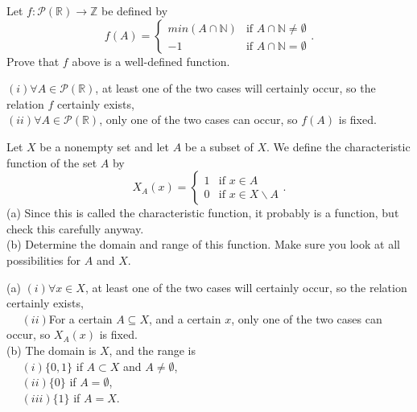 \documentclass[11pt, a4paper, UTF8]{ctexart}
\begin{document}
\begin{problem}[UD: 13.4]
  Let $f:\mathcal{P}(\mathbb{R}) \rightarrow \mathbb{Z}$ be defined by\\
  $$f(A) = 
    \begin{cases}
      min(A \cap \mathbb{N})& \text{if $A \cap \mathbb{N} \neq \emptyset$}\\
      -1& \text{if $A \cap \mathbb{N} = \emptyset$}
    \end{cases}.$$
  Prove that $f$ above is a well-defined function.
\end{problem}

\begin{solution}
  $(i)\forall A \in \mathcal{P}(\mathbb{R})$, at least one of the two cases will certainly occur, so the relation $f$
  certainly exists,\\
  $(ii)\forall A \in \mathcal{P}(\mathbb{R})$, only one of the two cases can occur, so $f(A)$ 
  is fixed.
\end{solution}
\begin{problem}[UD: 13.5]
  Let $X$ be a nonempty set and let $A$ be a subset of $X$. We define the characteristic 
  function of the set $A$ by
  $$X_{A}(x) = 
    \begin{cases}
      1& \text{if $x \in A$}\\
      0& \text{if $x \in X \backslash A$}
    \end{cases}.$$
    (a) Since this is called the characteristic function, it probably is a function, 
    but check this carefully anyway.\\
    (b) Determine the domain and range of this function. Make sure you look at all 
    possibilities for $A$ and $X$.  
\end{problem}


\begin{solution}
  (a) $(i)\forall x \in X$, at least one of the two cases will certainly occur, 
  so the relation certainly exists,\\
  $~~~~~~(ii)$For a certain $A \subseteq X$, and a certain $x$, only one of the two cases can occur, so $X_{A}(x)$
  is fixed.\\
  (b) The domain is $X$, and the range is\\
  $~~~~~~(i)\{0,1\}$ if $A \subset X$ and $A \neq \emptyset$,\\
  $~~~~~~(ii)\{0\}$ if $A = \emptyset$,\\
  $~~~~~~(iii)\{1\}$ if $A = X$.
\end{solution}
\end{document}
